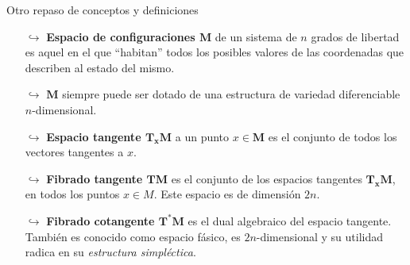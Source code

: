 \documentclass[8pt]{beamer}
\renewcommand{\>}{\rangle}
\newcommand{\<}{\langle}
\begin{document}
\begin{frame}{Otro repaso de conceptos y definiciones}

\begin{itemize}
\item[$\hookrightarrow$] \textbf{Espacio de configuraciones $\mathbf{M}$} de un sistema de $n$ grados de libertad es aquel en el que ``habitan'' todos los posibles valores de las coordenadas que describen al estado del mismo.\\[10pt]
\item[$\hookrightarrow$] $\mathbf{M}$ siempre puede ser dotado de una estructura de variedad diferenciable $n$-dimensional.\\[10pt]
\item[$\hookrightarrow$] \textbf{Espacio tangente $\mathbf{T_{x}M}$} a un punto $x \in \mathbf{M}$ es el conjunto de todos los vectores tangentes a $x$.\\[10pt]
\item[$\hookrightarrow$] \textbf{Fibrado tangente $\mathbf{TM}$} es el conjunto de los espacios tangentes $\mathbf{T_{x}M}$, en todos los puntos $x \in M$. Este espacio es de dimensión $2n$.\\[10pt]
\item[$\hookrightarrow$] \textbf{Fibrado cotangente $\mathbf{T^{\ast}M}$} es el dual algebraico del espacio tangente. También es conocido como espacio fásico, es $2n$-dimensional y su utilidad radica en su {\it estructura simpléctica}.
\end{itemize}

\end{frame}
\end{document}

